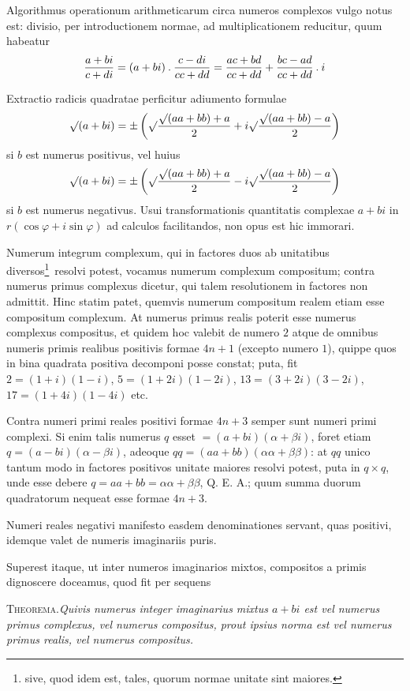 %
Algorithmus operationum arithmeticarum circa numeros complexos vulgo notus est: divisio, per introductionem normae, ad multiplicationem reducitur, quum habeatur
\[
\frac{a+bi}{c+di}=(a+bi)\mathbin{.}\frac{c-di}{cc+dd}=\frac{ac+bd}{cc+dd}+\frac{bc-ad}{cc+dd}\mathbin{.} i
\]

Extractio radicis quadratae perficitur adiumento formulae
\[
\surd(a+bi)=\pm\left(\surd\frac{\surd(aa+bb)+a}{2}+i\surd\frac{\surd(aa+bb)-a}{2}\right)
\]
si $b$ est numerus positivus, vel huius
\[
\surd(a+bi)=\pm\left(\surd\frac{\surd(aa+bb)+a}{2}-i\surd\frac{\surd(aa+bb)-a}{2}\right)
\]
si $b$ est numerus negativus. Usui transformationis quantitatis complexae $a+bi$ in $r(\cos\varphi+i\sin\varphi)$ ad calculos facilitandos, non opus est hic immorari.

Numerum integrum complexum, qui in factores duos ab unitatibus diversos\begingroup\renewcommand{\thefootnote}{*)}\footnote{sive, quod idem est, tales, quorum normae unitate sint maiores.}\endgroup\ resolvi potest, vocamus numerum complexum compositum; contra numerus primus complexus dicetur, qui talem resolutionem in factores non admittit. Hinc statim patet, quemvis numerum compositum realem etiam esse compositum complexum. At numerus primus realis poterit esse numerus complexus compositus, et quidem hoc valebit de numero $2$ atque de omnibus numeris primis realibus positivis formae $4n+1$ (excepto numero $1$), quippe quos in bina quadrata positiva decomponi posse constat; puta, fit $2=(1+i)(1-i)$, $5=(1+2i)(1-2i)$, $13=(3+2i)(3-2i)$, $17=(1+4i)(1-4i)$ etc.

Contra numeri primi reales positivi formae $4n+3$ semper sunt numeri primi complexi. Si enim talis numerus $q$ esset $=(a+bi)(\alpha+\beta i)$, foret etiam $q=(a-bi)(\alpha-\beta i)$, adeoque $qq=(aa+bb)(\alpha\alpha+\beta\beta)$: at $qq$ unico tantum modo in factores positivos unitate maiores resolvi potest, puta in $q\times q$, unde esse debere $q=aa+bb=\alpha\alpha+\beta\beta$, Q. E. A.; quum summa duorum quadratorum nequeat esse formae $4n+3$.

%
Numeri reales negativi manifesto easdem denominationes servant, quas positivi, idemque valet de numeris imaginariis puris.

Superest itaque, ut inter numeros imaginarios mixtos, compositos a primis dignoscere doceamus, quod fit per sequens

\textsc{Theorema.}\quad\emph{Quivis numerus integer imaginarius mixtus $a+bi$ est vel numerus primus complexus, vel numerus compositus, prout ipsius norma est vel numerus primus realis, vel numerus compositus.}

